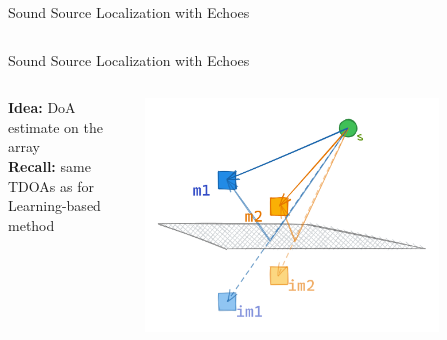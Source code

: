 \begin{frame}[t]{Sound Source Localization \alert{with Echoes} \hfill\faMapMarked*}
\begin{columns}[T,onlytextwidth]
    \end{columns}


\end{frame}

\begin{frame}{Sound Source Localization \alert{with Echoes} \hfill\faMapMarked*}

    \begin{columns}[onlytextwidth]
    \begin{column}{0.5\textwidth}
        \begin{block}{}
            \textbf{Idea:} DoA estimate on the \mirage array
            \\\textbf{Recall:} same TDOAs as for Learning-based method
        \end{block}

    \end{column}

    \begin{column}{0.5\textwidth}
        \centering
            \includegraphics[width=0.8\textwidth]{figures/mirage2.png}
        \end{column}
    \end{columns}



\end{frame}
